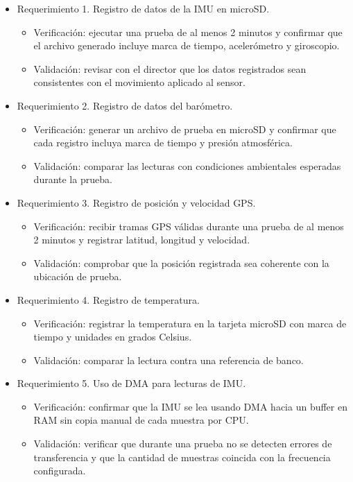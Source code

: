\documentclass[
11pt, %
]{charter}
\begin{document}
\begin{itemize}
\item Requerimiento 1. Registro de datos de la IMU en microSD.
	\begin{itemize}
	\item Verificación: ejecutar una prueba de al menos 2 minutos y confirmar que el archivo generado incluye marca de tiempo, acelerómetro y giroscopio.
	\item Validación: revisar con el director que los datos registrados sean consistentes con el movimiento aplicado al sensor.
	\end{itemize}
\item Requerimiento 2. Registro de datos del barómetro.
	\begin{itemize}
	\item Verificación: generar un archivo de prueba en microSD y confirmar que cada registro incluya marca de tiempo y presión atmosférica.
	\item Validación: comparar las lecturas con condiciones ambientales esperadas durante la prueba.
	\end{itemize}
\item Requerimiento 3. Registro de posición y velocidad GPS.
	\begin{itemize}
	\item Verificación: recibir tramas GPS válidas durante una prueba de al menos 2 minutos y registrar latitud, longitud y velocidad.
	\item Validación: comprobar que la posición registrada sea coherente con la ubicación de prueba.
	\end{itemize}
\item Requerimiento 4. Registro de temperatura.
	\begin{itemize}
	\item Verificación: registrar la temperatura en la tarjeta microSD con marca de tiempo y unidades en grados Celsius.
	\item Validación: comparar la lectura contra una referencia de banco.
	\end{itemize}
\item Requerimiento 5. Uso de DMA para lecturas de IMU.
	\begin{itemize}
	\item Verificación: confirmar que la IMU se lea usando DMA hacia un buffer en RAM sin copia manual de cada muestra por CPU.
	\item Validación: verificar que durante una prueba no se detecten errores de transferencia y que la cantidad de muestras coincida con la frecuencia configurada.

\end{itemize}
\end{itemize}
\end{document}
